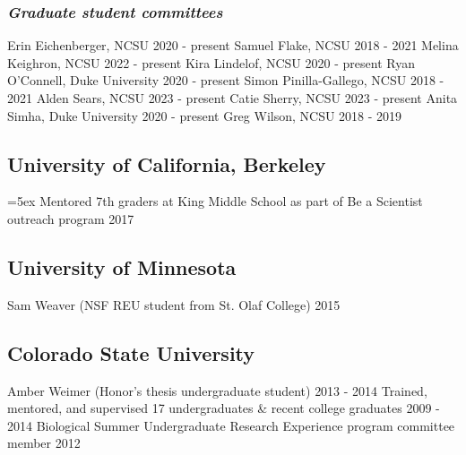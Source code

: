 \documentclass[11pt,english]{article}\usepackage[]{graphicx}\usepackage[]{xcolor}
\begin{document}
\subsubsection*{\emph{Graduate student committees}}
Erin Eichenberger, NCSU \hfill {2020 - present} \newline 
Samuel Flake, NCSU \hfill {2018 - 2021} \newline
Melina Keighron, NCSU \hfill {2022 - present} \newline
Kira Lindelof, NCSU \hfill {2020 - present} \newline
Ryan O'Connell, Duke University \hfill {2020 - present} \newline
Simon Pinilla-Gallego, NCSU \hfill {2018 - 2021} \newline
Alden Sears, NCSU \hfill {2023 - present} \newline
Catie Sherry, NCSU \hfill {2023 - present} \newline
Anita Simha, Duke University \hfill {2020 - present} \newline
Greg Wilson, NCSU \hfill {2018 - 2019} 

\subsection*{University of California, Berkeley}
\hangindent=5ex Mentored 7th graders at King Middle School as part of Be a Scientist outreach program \hfill {2017} 

\subsection*{University of Minnesota}
Sam Weaver (NSF REU student from St. Olaf College)		 \hfill {2015} 

\subsection*{Colorado State University}
Amber Weimer (Honor's thesis undergraduate student)		 \hfill {2013 - 2014} \newline
Trained, mentored, and supervised 17 undergraduates \& recent college graduates		 \hfill {2009 - 2014} \newline
Biological Summer Undergraduate Research Experience program committee member \hfill {2012} 

\vspace{1.5ex}
\end{document}
